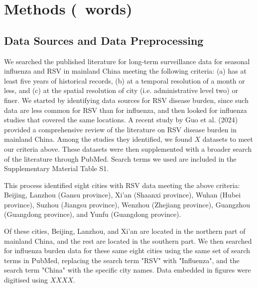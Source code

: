 \section{Methods (\methodswordcount~words)}

\subsection{Data Sources and Data Preprocessing}
We searched the published literature for long-term surveillance data for seasonal influenza and RSV in mainland China meeting the following criteria: (a) has at least five years of historical records, (b) at a temporal resolution of a month or less, and (c) at the spatial resolution of city (i.e. administrative level two) or finer.
We started by identifying data sources for RSV disease burden, since such data are less common for RSV than for influenza, and then looked for influenza studies that covered the same locations.
A recent study by Guo et al. (2024) provided a comprehensive review of the literature on RSV disease burden in mainland China.
Among the studies they identified, we found $X$ datasets to meet our criteria above.
These datasets were then supplemented with a broader search of the literature through PubMed.
Search terms we used are included in the Supplementary Material Table S1.

This process identified eight cities with RSV data meeting the above criteria: Beijing, Lanzhou (Gansu province), Xi'an (Shaanxi province), Wuhan (Hubei province), Suzhou (Jiangsu province), Wenzhou (Zhejiang province), Guangzhou (Guangdong province), and Yunfu (Guangdong province).

Of these cities, Beijing, Lanzhou, and Xi'an are located in the northern part of mainland China, and the rest are located in the southern part.
We then searched for influenza burden data for these same eight cities using the same set of search terms in PubMed, replacing the search term "RSV" with "Influenza", and the search term "China" with the specific city names.
Data embedded in figures were digitised using $XXXX$.


